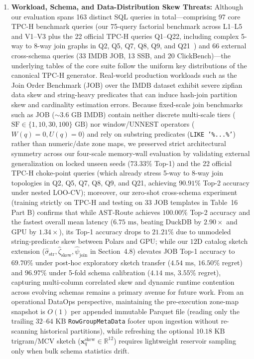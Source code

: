 \documentclass[10pt,a4paper]{article}
\begin{document}
\begin{enumerate}[leftmargin=1.5em,itemsep=2pt]
or general correlated-subquery engine; integrating native GPU SQL engines such as Sirius~\cite{yogatama2025sirius} or HeavyDB~\cite{root2019mapd} across broader hardware tiers is an important next step.
    \item \textbf{Workload, Schema, and Data-Distribution Skew Threats:} Although our evaluation spans 163 distinct SQL queries in total---comprising 97 core TPC-H benchmark queries (our 75-query factorial benchmark across L1--L5 and V1--V3 plus the 22 official TPC-H queries Q1--Q22, including complex 5-way to 8-way join graphs in Q2, Q5, Q7, Q8, Q9, and Q21~\cite{tpc2022tpch, dreseler2020quantifying}) and 66 external cross-schema queries (33 IMDB JOB, 13 SSB, and 20 ClickBench)---the underlying tables of the core suite follow the uniform key distributions of the canonical TPC-H generator. Real-world production workloads such as the Join Order Benchmark (JOB) \cite{leis2015job} over the IMDB dataset exhibit severe zipfian data skew and string-heavy predicates that can induce hash-join partition skew and cardinality estimation errors. Because fixed-scale join benchmarks such as JOB ($\sim 3.6\text{ GB}$ IMDB) contain neither discrete multi-scale tiers ($\text{SF} \in \{1, 10, 30, 100\}\text{ GB}$) nor window/UNNEST operators ($W(q)=0, U(q)=0$) and rely on substring predicates (\texttt{LIKE '\%...\%'}) rather than numeric/date zone maps, we preserved strict architectural symmetry across our four-scale memory-wall evaluation by validating external generalization on locked unseen seeds ($73.33\%$ Top-1) and the 22 official TPC-H choke-point queries (which already stress 5-way to 8-way join topologies in Q2, Q5, Q7, Q8, Q9, and Q21, achieving $90.91\%$ Top-2 accuracy under nested LOO-CV); moreover, our zero-shot cross-schema experiment (training strictly on TPC-H and testing on 33 JOB templates in Table~16 Part B) confirms that while AST-Route achieves $100.00\%$ Top-2 accuracy and the fastest overall mean latency ($6.75\text{ ms}$, beating DuckDB by $2.90\times$ and GPU by $1.34\times$), its Top-1 accuracy drops to $21.21\%$ due to unmodeled string-predicate skew between Polars and GPU; while our $12\text{D}$ catalog sketch extension ($\hat{\sigma}_{\text{str}}, \hat{\zeta}_{\text{skew}}, \hat{\psi}_{\text{join}}$ in Section~4.8) elevates JOB Top-1 accuracy to $69.70\%$ under post-hoc exploratory sketch transfer ($4.54\text{ ms}$, $16.50\%$ regret) and $96.97\%$ under 5-fold schema calibration ($4.14\text{ ms}$, $3.55\%$ regret), capturing multi-column correlated skew and dynamic runtime contention across evolving schemas remains a primary avenue for future work. From an operational DataOps perspective, maintaining the pre-execution zone-map snapshot is $O(1)$ per appended immutable Parquet file (reading only the trailing $32$--$64\text{ KB}$ \texttt{RowGroupMetaData} footer upon ingestion without re-scanning historical partitions), while refreshing the optional $10.18\text{ KB}$ trigram/MCV sketch ($\mathbf{x}_q^{\text{skew}} \in \mathbb{R}^{12}$) requires lightweight reservoir sampling only when bulk schema statistics drift.

\end{enumerate}
\end{document}
